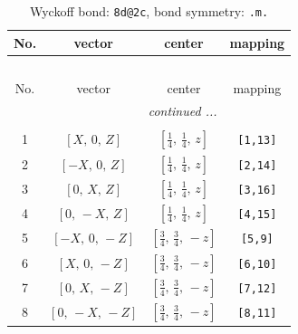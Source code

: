 \documentclass[fleqn,8pt]{jsarticle}
\begin{document}
\renewcommand{\arraystretch}{1.2}
\begin{longtable}{cccc}
\caption{Wyckoff bond: {\tt 8d@2c}, bond symmetry: {\tt .m.}}
 \\
 \hline \hline
No. & vector & center & mapping \\ \hline \endfirsthead

\multicolumn{3}{l}{\tablename\ \thetable{}} \\
 \hline \hline
No. & vector & center & mapping \\ \hline \endhead

 \hline \hline
\multicolumn{3}{r}{\footnotesize\it continued ...} \\ \endfoot

 \hline \hline
\multicolumn{3}{r}{} \\ \endlastfoot

1 & $\left[ X,\, 0,\, Z \right]$ & $\left[ \frac{1}{4},\, \frac{1}{4},\, z \right]$ & {\tt [1,13]} \\ \hline
2 & $\left[ - X,\, 0,\, Z \right]$ & $\left[ \frac{1}{4},\, \frac{1}{4},\, z \right]$ & {\tt [2,14]} \\ \hline
3 & $\left[ 0,\, X,\, Z \right]$ & $\left[ \frac{1}{4},\, \frac{1}{4},\, z \right]$ & {\tt [3,16]} \\ \hline
4 & $\left[ 0,\, - X,\, Z \right]$ & $\left[ \frac{1}{4},\, \frac{1}{4},\, z \right]$ & {\tt [4,15]} \\ \hline
5 & $\left[ - X,\, 0,\, - Z \right]$ & $\left[ \frac{3}{4},\, \frac{3}{4},\, - z \right]$ & {\tt [5,9]} \\ \hline
6 & $\left[ X,\, 0,\, - Z \right]$ & $\left[ \frac{3}{4},\, \frac{3}{4},\, - z \right]$ & {\tt [6,10]} \\ \hline
7 & $\left[ 0,\, X,\, - Z \right]$ & $\left[ \frac{3}{4},\, \frac{3}{4},\, - z \right]$ & {\tt [7,12]} \\ \hline
8 & $\left[ 0,\, - X,\, - Z \right]$ & $\left[ \frac{3}{4},\, \frac{3}{4},\, - z \right]$ & {\tt [8,11]} \\
\end{longtable}
\renewcommand{\arraystretch}{1.2}
\end{document}
